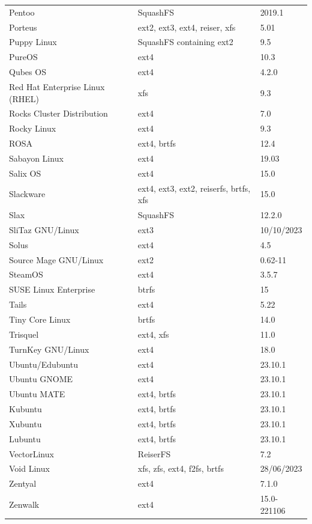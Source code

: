 \documentclass[12pt, a4paper]{book}
\begin{document}
\begin{longtable}{|l|l|l|}
Pentoo & SquashFS & 2019.1 \\
Porteus & ext2, ext3, ext4, reiser, xfs & 5.01 \\
Puppy Linux & SquashFS containing ext2 & 9.5 \\
PureOS & ext4 & 10.3 \\
Qubes OS & ext4 & 4.2.0 \\
Red Hat Enterprise Linux (RHEL) & xfs & 9.3 \\
Rocks Cluster Distribution & ext4 & 7.0 \\
Rocky Linux & ext4 & 9.3 \\
ROSA & ext4, brtfs & 12.4 \\
Sabayon Linux & ext4 & 19.03 \\
Salix OS & ext4 & 15.0 \\
Slackware & ext4, ext3, ext2, reiserfs, brtfs, xfs & 15.0 \\
Slax & SquashFS & 12.2.0 \\
SliTaz GNU/Linux & ext3 & 10/10/2023 \\
Solus & ext4 & 4.5 \\
Source Mage GNU/Linux & ext2 & 0.62-11 \\
SteamOS & ext4 & 3.5.7 \\
SUSE Linux Enterprise & btrfs & 15 \\
Tails & ext4 & 5.22 \\
Tiny Core Linux & brtfs & 14.0 \\
Trisquel & ext4, xfs & 11.0 \\
TurnKey GNU/Linux & ext4 & 18.0 \\
Ubuntu/Edubuntu & ext4 & 23.10.1 \\
Ubuntu GNOME & ext4 & 23.10.1 \\
Ubuntu MATE & ext4, brtfs & 23.10.1 \\
Kubuntu & ext4, brtfs & 23.10.1 \\
Xubuntu & ext4, brtfs & 23.10.1 \\
Lubuntu & ext4, brtfs & 23.10.1 \\
VectorLinux & ReiserFS & 7.2 \\
Void Linux & xfs, zfs, ext4, f2fs, brtfs  & 28/06/2023 \\
Zentyal & ext4 & 7.1.0 \\
Zenwalk & ext4 & 15.0-221106 \\
\hline
\end{longtable}


\cleardoublepage
\thispagestyle{empty}
\end{document}
